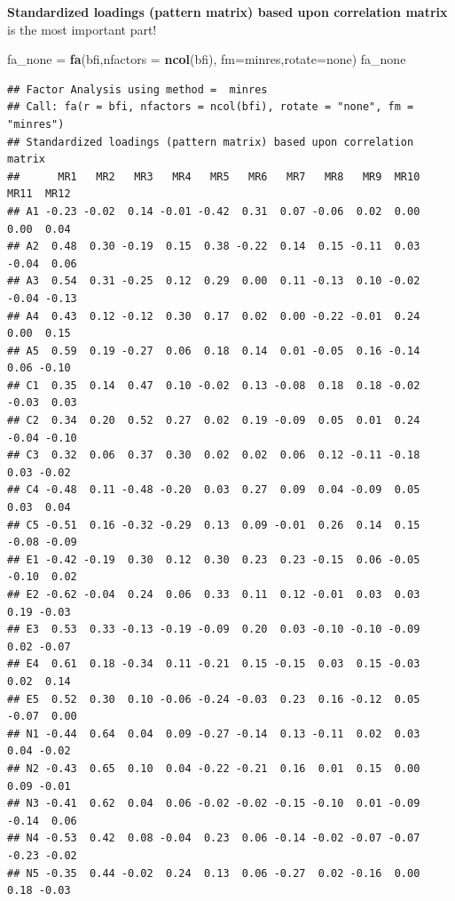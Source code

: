 \documentclass[
]{ctexart}
\newenvironment{Shaded}{\begin{snugshade}}{\end{snugshade}}
\newcommand{\AttributeTok}[1]{\textcolor[rgb]{0.13,0.29,0.53}{#1}}
\newcommand{\FunctionTok}[1]{\textcolor[rgb]{0.13,0.29,0.53}{\textbf{#1}}}
\newcommand{\NormalTok}[1]{#1}
\newcommand{\OtherTok}[1]{\textcolor[rgb]{0.56,0.35,0.01}{#1}}
\newcommand{\StringTok}[1]{\textcolor[rgb]{0.31,0.60,0.02}{#1}}
\begin{document}
\textbf{Standardized loadings (pattern matrix) based upon correlation
matrix} is the most important part!

\begin{Shaded}
\begin{Highlighting}[]
\NormalTok{fa\_none }\OtherTok{=} \FunctionTok{fa}\NormalTok{(bfi,}\AttributeTok{nfactors =} \FunctionTok{ncol}\NormalTok{(bfi),}
             \AttributeTok{fm=}\StringTok{\textquotesingle{}minres\textquotesingle{}}\NormalTok{,}\AttributeTok{rotate=}\StringTok{\textquotesingle{}none\textquotesingle{}}\NormalTok{)  }
\NormalTok{fa\_none}
\end{Highlighting}
\end{Shaded}

\begin{verbatim}
## Factor Analysis using method =  minres
## Call: fa(r = bfi, nfactors = ncol(bfi), rotate = "none", fm = "minres")
## Standardized loadings (pattern matrix) based upon correlation matrix
##      MR1   MR2   MR3   MR4   MR5   MR6   MR7   MR8   MR9  MR10  MR11  MR12
## A1 -0.23 -0.02  0.14 -0.01 -0.42  0.31  0.07 -0.06  0.02  0.00  0.00  0.04
## A2  0.48  0.30 -0.19  0.15  0.38 -0.22  0.14  0.15 -0.11  0.03 -0.04  0.06
## A3  0.54  0.31 -0.25  0.12  0.29  0.00  0.11 -0.13  0.10 -0.02 -0.04 -0.13
## A4  0.43  0.12 -0.12  0.30  0.17  0.02  0.00 -0.22 -0.01  0.24  0.00  0.15
## A5  0.59  0.19 -0.27  0.06  0.18  0.14  0.01 -0.05  0.16 -0.14  0.06 -0.10
## C1  0.35  0.14  0.47  0.10 -0.02  0.13 -0.08  0.18  0.18 -0.02 -0.03  0.03
## C2  0.34  0.20  0.52  0.27  0.02  0.19 -0.09  0.05  0.01  0.24 -0.04 -0.10
## C3  0.32  0.06  0.37  0.30  0.02  0.02  0.06  0.12 -0.11 -0.18  0.03 -0.02
## C4 -0.48  0.11 -0.48 -0.20  0.03  0.27  0.09  0.04 -0.09  0.05  0.03  0.04
## C5 -0.51  0.16 -0.32 -0.29  0.13  0.09 -0.01  0.26  0.14  0.15 -0.08 -0.09
## E1 -0.42 -0.19  0.30  0.12  0.30  0.23  0.23 -0.15  0.06 -0.05 -0.10  0.02
## E2 -0.62 -0.04  0.24  0.06  0.33  0.11  0.12 -0.01  0.03  0.03  0.19 -0.03
## E3  0.53  0.33 -0.13 -0.19 -0.09  0.20  0.03 -0.10 -0.10 -0.09  0.02 -0.07
## E4  0.61  0.18 -0.34  0.11 -0.21  0.15 -0.15  0.03  0.15 -0.03  0.02  0.14
## E5  0.52  0.30  0.10 -0.06 -0.24 -0.03  0.23  0.16 -0.12  0.05 -0.07  0.00
## N1 -0.44  0.64  0.04  0.09 -0.27 -0.14  0.13 -0.11  0.02  0.03  0.04 -0.02
## N2 -0.43  0.65  0.10  0.04 -0.22 -0.21  0.16  0.01  0.15  0.00  0.09 -0.01
## N3 -0.41  0.62  0.04  0.06 -0.02 -0.02 -0.15 -0.10  0.01 -0.09 -0.14  0.06
## N4 -0.53  0.42  0.08 -0.04  0.23  0.06 -0.14 -0.02 -0.07 -0.07 -0.23 -0.02
## N5 -0.35  0.44 -0.02  0.24  0.13  0.06 -0.27  0.02 -0.16  0.00  0.18 -0.03

\end{verbatim}
\end{document}
